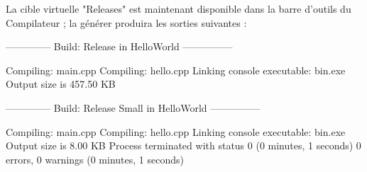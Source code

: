 
La cible virtuelle "Releases" est maintenant disponible dans la barre d'outils du Compilateur ; la générer produira les sorties suivantes :

\begin{code}
-------------- Build: Release in HelloWorld ---------------

Compiling: main.cpp
Compiling: hello.cpp
Linking console executable: bin\Release\HelloWorld.exe
Output size is 457.50 KB

-------------- Build: Release Small in HelloWorld ---------------

Compiling: main.cpp
Compiling: hello.cpp
Linking console executable: bin\ReleaseSmall\HelloWorld.exe
Output size is 8.00 KB
Process terminated with status 0 (0 minutes, 1 seconds)
0 errors, 0 warnings (0 minutes, 1 seconds) 
\end{code}
